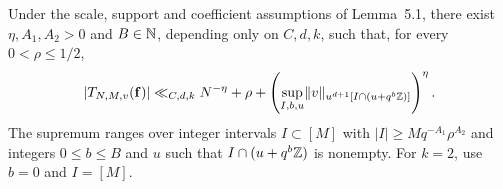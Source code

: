 \begin{theorem}\label{t:main}
\leanok
{}
Under the scale, support and coefficient assumptions of Lemma~5.1,
there exist $\eta,A_1,A_2>0$ and $B\in\mathbb N$, depending only on
$C,d,k$, such that, for every $0<\rho\le1/2$,
\[
 \lvert T_{N,M,v}(\mathbf f)\rvert
 \ll_{C,d,k}
 N^{-\eta}+\rho+
 \left(\sup_{I,b,u}\lVert v\rVert_{u^{d+1}[I\cap(u+q^b\mathbb Z)]}\right)^\eta .
\]
The supremum ranges over integer intervals $I\subset[M]$ with
$|I|\ge Mq^{-A_1}\rho^{A_2}$ and integers $0\le b\le B$ and $u$ such
that $I\cap(u+q^b\mathbb Z)$ is nonempty. For $k=2$, use $b=0$ and $I=[M]$.
\end{theorem}
